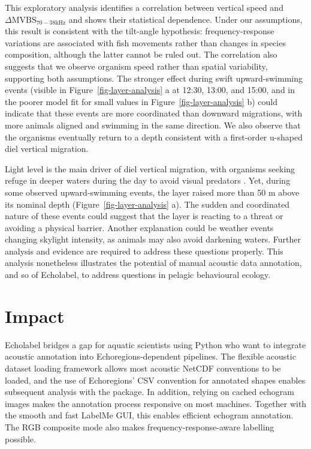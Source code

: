 \documentclass[
  number,
  preprint,
  3p]{elsarticle}
\newcounter{none} %
\begin{document}
This exploratory analysis identifies a correlation between vertical
speed and \(\Delta \text{MVBS}_{70 - 38 \text{kHz}}\) and shows their
statistical dependence. Under our assumptions, this result is consistent
with the tilt-angle hypothesis: frequency-response variations are
associated with fish movements rather than changes in species
composition, although the latter cannot be ruled out. The correlation
also suggests that we observe organism speed rather than spatial
variability, supporting both assumptions. The stronger effect during
swift upward-swimming events (visible in Figure~\ref{fig-layer-analysis}
a at 12:30, 13:00, and 15:00, and in the poorer model fit for small
values in Figure~\ref{fig-layer-analysis} b) could indicate that these
events are more coordinated than downward migrations, with more animals
aligned and swimming in the same direction. We also observe that the
organisms eventually return to a depth consistent with a first-order
u-shaped diel vertical migration.

Light level is the main driver of diel vertical migration, with
organisms seeking refuge in deeper waters during the day to avoid visual
predators \citep{brierley2014}. Yet, during some observed
upward-swimming events, the layer raised more than 50 m above its
nominal depth (Figure~\ref{fig-layer-analysis} a). The sudden and
coordinated nature of these events could suggest that the layer is
reacting to a threat \citep{urmy2021} or avoiding a physical barrier.
Another explanation could be weather events changing skylight intensity,
as animals may also avoid darkening waters. Further analysis and
evidence are required to address these questions properly. This analysis
nonetheless illustrates the potential of manual acoustic data
annotation, and so of Echolabel, to address questions in pelagic
behavioural ecology.

\section{Impact}\label{impact}

Echolabel bridges a gap for aquatic scientists using Python who want to
integrate acoustic annotation into Echoregions-dependent pipelines. The
flexible acoustic dataset loading framework allows most acoustic NetCDF
conventions to be loaded, and the use of Echoregions' CSV convention for
annotated shapes enables subsequent analysis with the package. In
addition, relying on cached echogram images makes the annotation process
responsive on most machines. Together with the smooth and fast LabelMe
GUI, this enables efficient echogram annotation. The RGB composite mode
also makes frequency-response-aware labelling possible.
\end{document}
